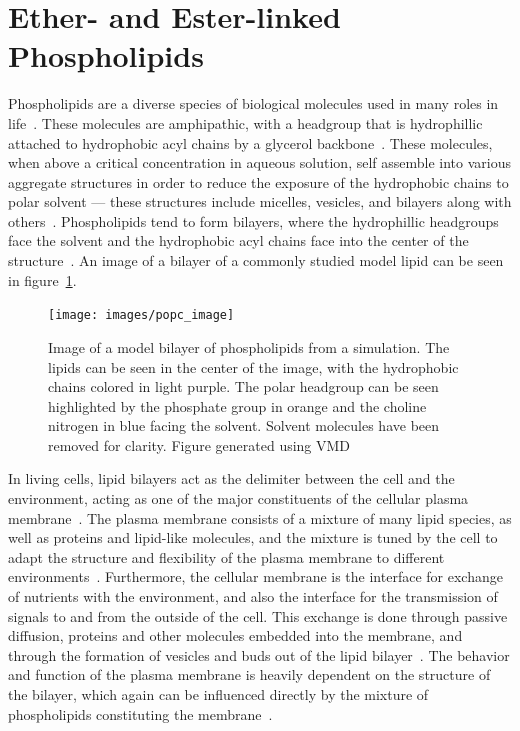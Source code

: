 \documentclass[12pt,openany,final]{book}
\begin{document}
\section{Ether- and Ester-linked Phospholipids}
Phospholipids are a diverse species of biological molecules used in many roles in life~\cite{van:2008:lipidvariety}. These molecules
are amphipathic, with a headgroup that is hydrophillic attached to hydrophobic acyl chains by a
glycerol backbone~\cite{pandit:2008:simulationtextbook,israelachvili:2011:intermol}. 
These molecules, when above a critical concentration in aqueous solution, self assemble into
various aggregate structures in order 
to reduce the exposure of the hydrophobic chains
to polar solvent --- these structures include
micelles, vesicles, and bilayers along with others~\cite{israelachvili:2011:intermol}. 
Phospholipids tend to form bilayers, 
where the hydrophillic headgroups face the solvent and the 
hydrophobic acyl chains face into the center 
of the structure~\cite{israelachvili:2011:intermol,ashrafuzzaman:2012:membrane}. 
An image of a bilayer of a commonly studied
model lipid can be seen
in figure~\ref{fig:boximage}.
\begin{figure}[htp]
    \caption[Image of a model bilayer of phospholipids from a simulation.]{ Image of a model bilayer of phospholipids from a simulation. The lipids can be seen
in the center of the image, with the hydrophobic chains colored in
light purple. The polar headgroup can be seen highlighted by the phosphate group in orange and the choline nitrogen in blue
facing the solvent. Solvent molecules have been removed for clarity. Figure generated
using VMD~\cite{vmd}}
\label{fig:boximage}
\texttt{[image: images/popc\_image]}
\end{figure}
In living cells, lipid bilayers act as the delimiter between the cell and the environment, acting as one of the major constituents of the cellular 
plasma membrane~\cite{reece:2014:biobook}. The plasma membrane consists of a mixture of many lipid species, as
well as proteins and lipid-like molecules, and the mixture is tuned by the cell to adapt the 
structure and flexibility of the plasma membrane to different environments~\cite{pandit:2008:simulationtextbook,van:2008:lipidvariety,zhang:2008:memhomeo}. 
Furthermore, the cellular membrane is the interface for exchange
of nutrients with the environment, and also the interface for the transmission of signals to and from the outside of the cell. This
exchange is done through passive diffusion, proteins and other molecules embedded into the membrane, and through the formation
of vesicles and buds out of the lipid bilayer~\cite{reece:2014:biobook}. The behavior and function of the plasma membrane
is heavily dependent on the structure of the bilayer, which again can be influenced directly by the mixture of phospholipids constituting the
membrane~\cite{van:2008:lipidvariety,zhang:2008:memhomeo}.
\end{document}
